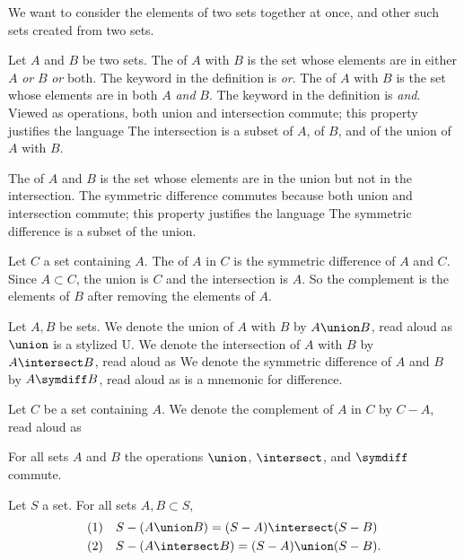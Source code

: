 
\sbasic




\sstart



We want to consider the elements of two sets together at once, and other such sets created from two sets.


Let $A$ and $B$ be two sets.
The  of $A$ with $B$ is the set whose elements are in either $A$ \textit{or} $B$ \textit{or} both.
The keyword in the definition is \textit{or}.
The  of $A$ with $B$ is the set whose elements are in both $A$ \textit{and} $B$.
The keyword in the definition is \textit{and}.
Viewed as operations, both union and intersection commute; this property justifies the language 
The intersection is a subset of $A$, of $B$, and of the union of $A$ with $B$.

The  of $A$ and $B$ is the set whose elements are in the union but not in the intersection.
The symmetric difference commutes because both union and intersection commute; this property justifies the language 
The symmetric difference is a subset of the union.


Let $C$ a set containing $A$.
The  of $A$ in $C$ is the symmetric difference of $A$ and $C$.
Since $A \subset C$, the union is $C$ and the intersection is $A$.
So the complement is the  elements of $B$ after removing the elements of $A$.


Let $A, B$ be sets.
We denote the union of $A$ with $B$ by $A \union B$, read aloud as 
$\union$ is a stylized U.
We denote the intersection of $A$ with $B$ by $A \intersect B$, read aloud as 
We denote the symmetric difference of $A$ and $B$ by $A \symdiff B$, read aloud as 
 is a mnemonic for difference.

Let $C$ be a set containing $A$.
We denote the complement of $A$ in $C$ by $C - A$, read aloud as 


\begin{prop}
  For all sets $A$ and $B$ the operations $\union$, $\intersect$, and $\symdiff$ commute.
\end{prop}

\begin{prop}
  Let $S$ a set.
  For all sets $A, B \subset S$,
  \[
    \begin{aligned}
      \text{(1)} \quad & S - (A \union B) = (S - A) \intersect (S - B) \\
      \text{(2)} \quad & S - (A \intersect B) = (S - A) \union (S - B).
    \end{aligned}
  \]
\end{prop}

\strats
